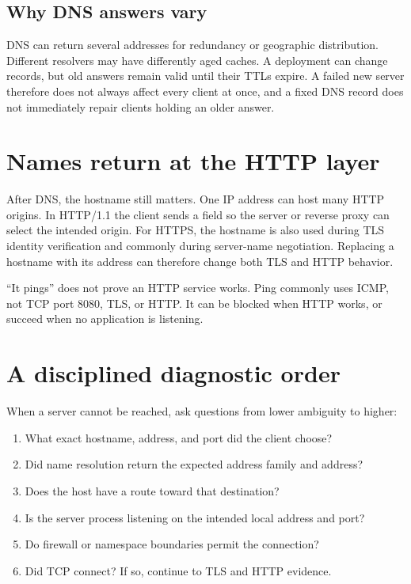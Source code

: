 \subsection{Why DNS answers vary}

DNS can return several addresses for redundancy or geographic distribution.
Different resolvers may have differently aged caches. A deployment can change
records, but old answers remain valid until their TTLs expire. A failed new
server therefore does not always affect every client at once, and a fixed DNS
record does not immediately repair clients holding an older answer.

\section{Names return at the HTTP layer}

After DNS, the hostname still matters. One IP address can host many HTTP origins.
In HTTP/1.1 the client sends a  field so the server or reverse proxy
can select the intended origin. For HTTPS, the hostname is also used during TLS
identity verification and commonly during server-name negotiation. Replacing a
hostname with its address can therefore change both TLS and HTTP behavior.

\begin{pitfall}
``It pings'' does not prove an HTTP service works. Ping commonly uses ICMP, not
TCP port 8080, TLS, or HTTP. It can be blocked when HTTP works, or succeed when
no application is listening.
\end{pitfall}

\section{A disciplined diagnostic order}

When a server cannot be reached, ask questions from lower ambiguity to higher:

\begin{enumerate}
  \item What exact hostname, address, and port did the client choose?
  \item Did name resolution return the expected address family and address?
  \item Does the host have a route toward that destination?
  \item Is the server process listening on the intended local address and port?
  \item Do firewall or namespace boundaries permit the connection?
  \item Did TCP connect? If so, continue to TLS and HTTP evidence.
\end{enumerate}

